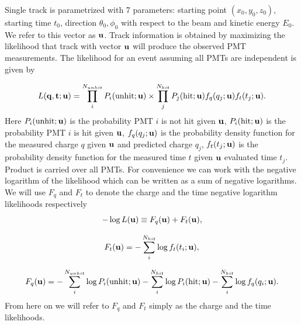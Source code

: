 Single track is parametrized with 7 parameters: starting point $(x_0, y_0, z_0)$,
starting time $t_0$, direction $\theta_0, \phi_0$ with respect to the beam
and kinetic energy $E_0$. We refer to this vector as ${\bf u}$.
Track information is obtained by maximizing the likelihood that
track with vector ${\bf u}$ will produce the observed PMT
measurements. The likelihood for an event assuming all PMTs are independent
is given by

\begin{equation}
	L({\bf q, t; u})=\prod_i^{N_{unhit}} P_i(\text{unhit}; {\bf u})\times\prod_j^{N_{hit}} P_j(\text{hit}; {\bf u})f_q(q_j;{\bf u}) f_t(t_j;{\bf u}).
\end{equation}
Here $P_i(\text{unhit}; {\bf u})$ is the probability PMT $i$ is not hit given ${\bf u}$,
$P_i(\text{hit}; {\bf u})$ is the probability PMT $i$ is hit given ${\bf u}$,
$f_q(q_j;{\bf u})$ is the probability density function for the measured charge $q$ given ${\bf u}$ and
predicted charge $q_j$,
$f_t(t_j;{\bf u})$ is the probability density function for the measured time $t$ given ${\bf u}$
evaluated time $t_j$. Product is carried over all PMTs. For convenience 
we can work with the negative logarithm of the likelihood which can 
be written as a sum of negative logarithms. We will use $F_q$ and $F_t$ to denote the
charge and the time negative logarithm likelihoods respectively  
\begin{equation}
	-\log L({\bf u}) \equiv F_q({\bf u}) + F_t({\bf u}),
\end{equation}

\begin{equation}
	F_t({\bf u}) = -\sum_i^{N_{hit}} \log f_t(t_i;{\bf u}),
\end{equation}

\begin{equation}
	F_q({\bf u}) = -\sum_i^{N_{unhit}}\log P_i(\text{unhit}; {\bf u})-\sum_i^{N_{hit}}\log P_i(\text{hit}; {\bf u}) - \sum_i^{N_{hit}} \log f_q(q_i;{\bf u}).
\end{equation}
From here on we will refer to $F_q$ and $F_t$ simply as the charge and the time likelihoods.

